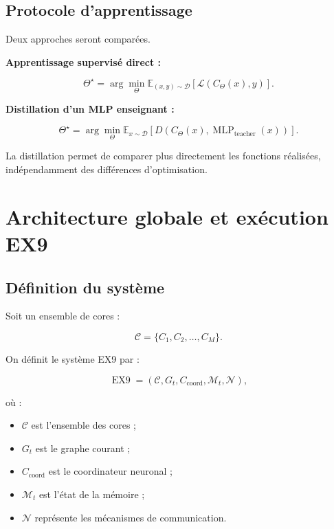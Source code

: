 \documentclass[11pt,a4paper]{article}
\begin{document}
\subsection{Protocole d'apprentissage}

Deux approches seront comparées.

\textbf{Apprentissage supervisé direct :}

\[
\Theta^\star
=
\arg\min_{\Theta}
\mathbb{E}_{(x,y)\sim\mathcal{D}}
\left[
\mathcal{L}(C_{\Theta}(x),y)
\right].
\]

\textbf{Distillation d'un MLP enseignant :}

\[
\Theta^\star
=
\arg\min_{\Theta}
\mathbb{E}_{x\sim\mathcal{D}}
\left[
D\left(
C_{\Theta}(x),
\operatorname{MLP}_{\mathrm{teacher}}(x)
\right)
\right].
\]

La distillation permet de comparer plus directement les fonctions
réalisées, indépendamment des différences d'optimisation.

\section{Architecture globale et exécution EX9}

\subsection{Définition du système}

Soit un ensemble de cores :

\[
\mathcal{C}
=
\{C_1,C_2,\ldots,C_M\}.
\]

On définit le système EX9 par :

\[
\operatorname{EX9}
=
\left(
\mathcal{C},
G_t,
C_{\mathrm{coord}},
\mathcal{M}_t,
\mathcal{N}
\right),
\]

où :
\begin{itemize}
  \item $\mathcal{C}$ est l'ensemble des cores ;
  \item $G_t$ est le graphe courant ;
  \item $C_{\mathrm{coord}}$ est le coordinateur neuronal ;
  \item $\mathcal{M}_t$ est l'état de la mémoire ;
  \item $\mathcal{N}$ représente les mécanismes de communication.
\end{itemize}
\end{document}

